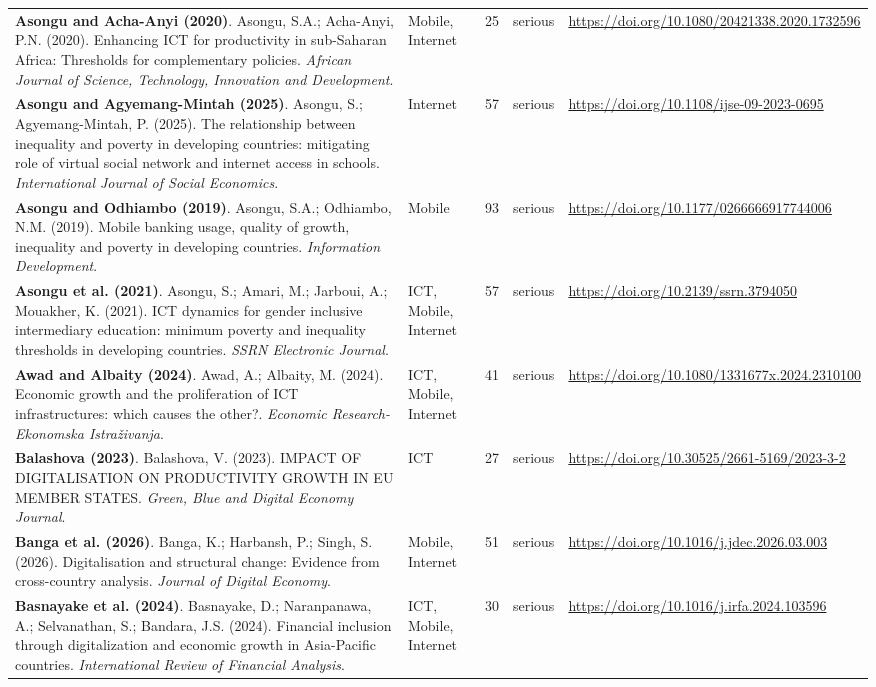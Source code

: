 {\begin{longtable}{@{}p{7.4cm} p{1.3cm} r l p{3.4cm}@{}}
\textbf{Asongu and Acha-Anyi (2020)}. Asongu, S.A.; Acha-Anyi, P.N. (2020). Enhancing ICT for productivity in sub-Saharan Africa: Thresholds for complementary policies. \emph{African Journal of Science, Technology, Innovation and Development}. & Mobile, Internet & 25 & serious & \url{https://doi.org/10.1080/20421338.2020.1732596} \\
\textbf{Asongu and Agyemang-Mintah (2025)}. Asongu, S.; Agyemang-Mintah, P. (2025). The relationship between inequality and poverty in developing countries: mitigating role of virtual social network and internet access in schools. \emph{International Journal of Social Economics}. & Internet & 57 & serious & \url{https://doi.org/10.1108/ijse-09-2023-0695} \\
\textbf{Asongu and Odhiambo (2019)}. Asongu, S.A.; Odhiambo, N.M. (2019). Mobile banking usage, quality of growth, inequality and poverty in developing countries. \emph{Information Development}. & Mobile & 93 & serious & \url{https://doi.org/10.1177/0266666917744006} \\
\textbf{Asongu et al. (2021)}. Asongu, S.; Amari, M.; Jarboui, A.; Mouakher, K. (2021). ICT dynamics for gender inclusive intermediary education: minimum poverty and inequality thresholds in developing countries. \emph{SSRN Electronic Journal}. & ICT, Mobile, Internet & 57 & serious & \url{https://doi.org/10.2139/ssrn.3794050} \\
\textbf{Awad and Albaity (2024)}. Awad, A.; Albaity, M. (2024). Economic growth and the proliferation of ICT infrastructures: which causes the other?. \emph{Economic Research-Ekonomska Istraživanja}. & ICT, Mobile, Internet & 41 & serious & \url{https://doi.org/10.1080/1331677x.2024.2310100} \\
\textbf{Balashova (2023)}. Balashova, V. (2023). IMPACT OF DIGITALISATION ON PRODUCTIVITY GROWTH IN EU MEMBER STATES. \emph{Green, Blue and Digital Economy Journal}. & ICT & 27 & serious & \url{https://doi.org/10.30525/2661-5169/2023-3-2} \\
\textbf{Banga et al. (2026)}. Banga, K.; Harbansh, P.; Singh, S. (2026). Digitalisation and structural change: Evidence from cross-country analysis. \emph{Journal of Digital Economy}. & Mobile, Internet & 51 & serious & \url{https://doi.org/10.1016/j.jdec.2026.03.003} \\
\textbf{Basnayake et al. (2024)}. Basnayake, D.; Naranpanawa, A.; Selvanathan, S.; Bandara, J.S. (2024). Financial inclusion through digitalization and economic growth in Asia-Pacific countries. \emph{International Review of Financial Analysis}. & ICT, Mobile, Internet & 30 & serious & \url{https://doi.org/10.1016/j.irfa.2024.103596} \\

\end{longtable}}
